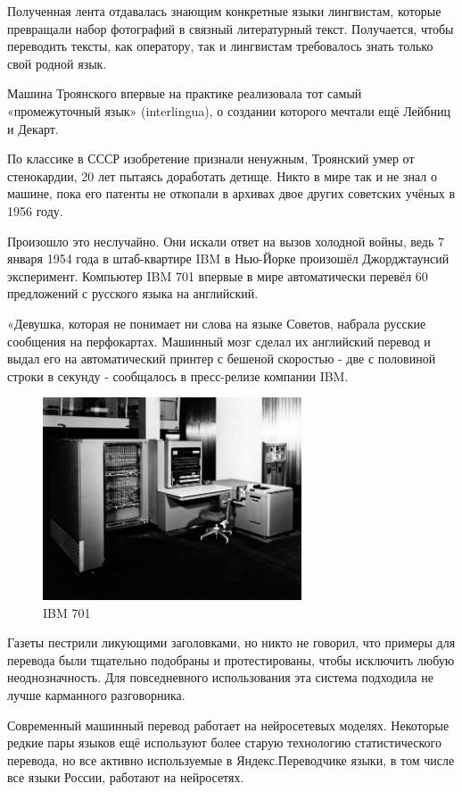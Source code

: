 	Полученная лента отдавалась знающим конкретные языки лингвистам, которые превращали набор фотографий в связный литературный текст. Получается, чтобы переводить тексты, как оператору, так и лингвистам требовалось знать только свой родной язык.

    Машина Троянского впервые на практике реализовала тот самый «промежуточный язык» (interlingua), о создании которого мечтали ещё Лейбниц и Декарт.
    
    По классике в СССР изобретение признали ненужным, Троянский умер от стенокардии, 20 лет пытаясь доработать детище. Никто в мире так и не знал о машине, пока его патенты не откопали в архивах двое других советских учёных в 1956 году.
    
    Произошло это неслучайно. Они искали ответ на вызов холодной войны, ведь 7 января 1954 года в штаб-квартире IBM в Нью-Йорке произошёл Джорджтаунсий эксперимент. Компьютер IBM 701 впервые в мире автоматически перевёл 60 предложений с русского языка на английский.
    
    «Девушка, которая не понимает ни слова на языке Советов, набрала русские сообщения на перфокартах. Машинный мозг сделал их английский перевод и выдал его на автоматический принтер с бешеной скоростью - две с половиной строки в секунду - сообщалось в пресс-релизе компании IBM.
    
    \begin{figure}[ht!]
		\centering
		\captionsetup{justification=centering}
		\includegraphics[height=60mm]{img/IBM 701.jpg}
		\caption{IBM 701}
	\end{figure}
    
    Газеты пестрили ликующими заголовками, но никто не говорил, что примеры для перевода были тщательно подобраны и протестированы, чтобы исключить любую неоднозначность. Для повседневного использования эта система подходила не лучше карманного разговорника.
    
    Современный машинный перевод работает на нейросетевых моделях. Некоторые редкие пары языков ещё используют более старую технологию статистического перевода, но все активно используемые в Яндекс.Переводчике языки, в том числе все языки России, работают на нейросетях.


